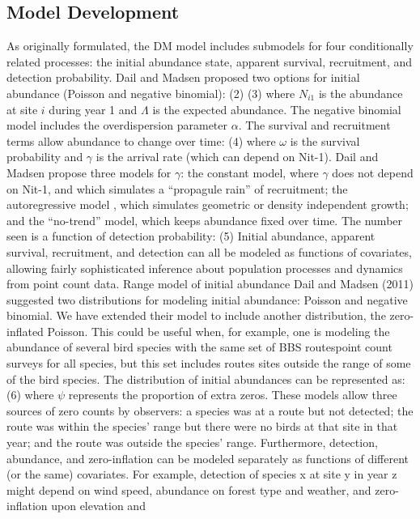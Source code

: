 \documentclass{article}
\begin{document}
\subsection{Model Development}

As originally formulated, the DM model includes submodels for four
conditionally related processes: the initial abundance state, apparent
survival, recruitment, and detection probability. Dail and Madsen
proposed two options for initial abundance (Poisson and negative
binomial):
(2)
(3)
where $N_{i1}$  is the abundance at site $i$  during year 1 and $\Lambda$ is
the expected abundance. The negative binomial model includes the
overdispersion parameter $\alpha$.  The survival and recruitment terms allow
abundance to change over time:
(4)
where $\omega$ is the survival probability and $\gamma$ is the arrival rate (which
can depend on Nit-1). Dail and Madsen propose three models for $\gamma$: the
constant model, where $\gamma$ does not depend on Nit-1, and which simulates
a ``propagule rain'' of recruitment; the autoregressive model , which
simulates geometric or density independent growth; and the ``no-trend''
model, which keeps abundance fixed over time.
The number seen is a function of detection probability:
(5)
Initial abundance, apparent survival, recruitment, and detection can
all be modeled as functions of covariates, allowing fairly
sophisticated inference about population processes and dynamics from
point count data.
Range model of initial abundance
Dail and Madsen (2011) suggested two distributions for modeling
initial abundance: Poisson and negative binomial.  We have extended
their model to include another distribution, the zero-inflated
Poisson.  This could be useful when, for example, one is modeling the
abundance of several bird species with the same set of BBS routespoint
count surveys for all species, but this set includes routes sites
outside the range of some of the bird species.  The distribution of
initial abundances can be represented as:
(6)
where $\psi$ represents the proportion of extra zeros.
These models allow three sources of zero counts by observers: a
species was at a route but not detected; the route was within the
species' range but there were no birds at that site in that year; and
the route was outside the species' range.  Furthermore, detection,
abundance, and zero-inflation can be modeled separately as functions
of different (or the same) covariates.  For example, detection of
species x at site y in year z might depend on wind speed, abundance on
forest type and weather, and zero-inflation upon elevation and
\end{document}
